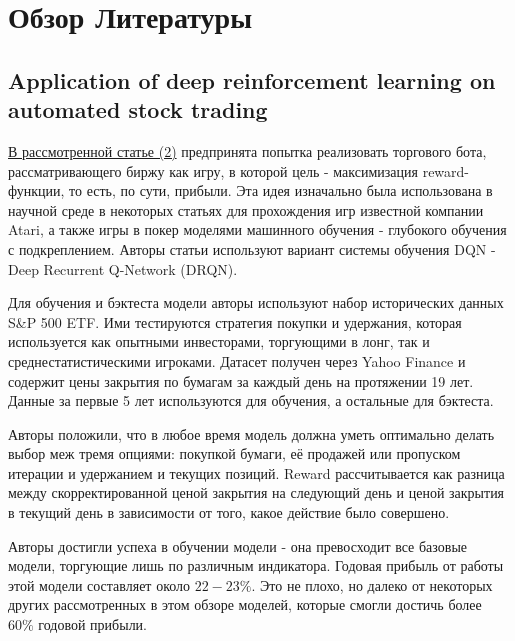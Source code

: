 \documentclass[a4paper,14pt]{extarticle}
\newcommand{\bibref}[3]{\hyperlink{#1}{#2 (#3)}} %
\begin{document}
\section{Обзор Литературы}

\subsection{Application of deep reinforcement learning on automated stock trading}
\bibref{2}{В рассмотренной статье}{2} предпринята попытка реализовать торгового бота, рассматривающего биржу как игру, в которой цель - максимизация reward-функции, то есть, по сути, прибыли. Эта идея изначально была использована в научной среде в некоторых статьях для прохождения игр известной компании Atari, а также игры в покер моделями машинного обучения - глубокого обучения с подкреплением. Авторы статьи используют вариант системы обучения DQN - Deep Recurrent Q-Network (DRQN).

Для обучения и бэктеста модели авторы используют набор исторических данных S\&P 500 ETF. Ими тестируются стратегия покупки и удержания, которая используется как опытными инвесторами, торгующими в лонг, так и среднестатистическими игроками. Датасет получен через Yahoo Finance и содержит цены закрытия по бумагам за каждый день на протяжении 19 лет. Данные за первые 5 лет используются для обучения, а остальные для бэктеста.

Авторы положили, что в любое время модель должна уметь оптимально делать выбор меж тремя опциями: покупкой бумаги, её продажей или пропуском итерации и удержанием и текущих позиций. Reward рассчитывается как разница между скорректированной ценой закрытия на следующий день и ценой закрытия в текущий день в зависимости от того, какое действие было совершено.

Авторы достигли успеха в обучении модели - она превосходит все базовые модели, торгующие лишь по различным индикатора. Годовая прибыль от работы этой модели составляет около $22-23\%$. Это не плохо, но далеко от некоторых других рассмотренных в этом обзоре моделей, которые смогли достичь более $60\%$ годовой прибыли.
\end{document}
